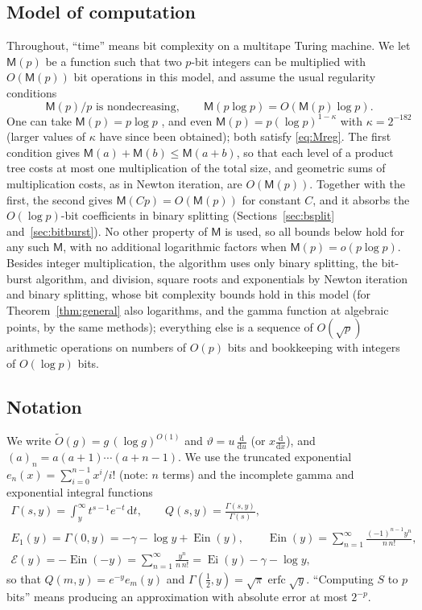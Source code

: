\documentclass[11pt]{amsart}
\theoremstyle{definition}
\theoremstyle{remark}
\newcommand{\Ein}{\operatorname{Ein}}
\newcommand{\Eip}{\mathcal{E}}
\newcommand{\erfc}{\operatorname{erfc}}
\newcommand{\dd}{\,\mathrm{d}}
\newcommand{\Mul}{\mathsf{M}}
\begin{document}
\subsection{Model of computation}
Throughout, ``time'' means bit complexity on a multitape Turing machine. We let $\Mul(p)$ be a function such that
two $p$-bit integers can be multiplied with $O(\Mul(p))$ bit operations in this model, and assume the usual
regularity conditions
\begin{equation}\label{eq:Mreg}
  \Mul(p)/p \text{ is nondecreasing}, \qquad \Mul(p\log p) = O(\Mul(p)\log p).
\end{equation}
One can take $\Mul(p) = p\log p$ \cite{HvdH21}, and even $\Mul(p) = p(\log p)^{1-\kappa}$ with $\kappa = 2^{-182}$
\cite{OAI26} (larger values of $\kappa$ have since been obtained); both satisfy \eqref{eq:Mreg}. The first condition
gives $\Mul(a) + \Mul(b) \le \Mul(a+b)$, so that each level of a product tree costs at most one multiplication of
the total size, and geometric sums of multiplication costs, as in Newton iteration, are $O(\Mul(p))$. Together with
the first, the second gives $\Mul(Cp) = O(\Mul(p))$ for constant $C$, and it absorbs the $O(\log p)$-bit
coefficients in binary splitting (Sections~\ref{sec:bsplit} and~\ref{sec:bitburst}). No other property of $\Mul$
is used, so all bounds below hold for any such $\Mul$, with no additional logarithmic factors when
$\Mul(p) = o(p\log p)$. Besides integer
multiplication, the algorithm uses only binary splitting, the bit-burst algorithm, and division, square
roots and exponentials by Newton iteration and binary splitting, whose bit complexity bounds hold in this
model \cite{BZ10} (for Theorem~\ref{thm:general} also logarithms, and the gamma function at algebraic
points, by the same methods); everything else is a sequence of $O(\sqrt p)$ arithmetic operations on numbers of $O(p)$
bits and bookkeeping with integers of $O(\log p)$ bits.

\subsection{Notation}
We write $\widetilde O(g) = g\,(\log g)^{O(1)}$ and $\vartheta = u\,\frac{\mathrm{d}}{\mathrm{d}u}$ (or
$x\frac{\mathrm{d}}{\mathrm{d}x}$), and $(a)_n = a(a+1)\cdots(a+n-1)$. We use the truncated exponential
$e_n(x) = \sum_{i=0}^{n-1} x^i/i!$ (note: $n$ terms) and the incomplete gamma and exponential integral functions
\begin{gather*}
  \Gamma(s, y) = \int_y^\infty t^{s-1}e^{-t}\dd t, \qquad Q(s,y) = \frac{\Gamma(s,y)}{\Gamma(s)}, \\
  E_1(y) = \Gamma(0, y) = -\gamma - \log y + \Ein(y), \qquad \Ein(y) = \sum_{n=1}^{\infty}\frac{(-1)^{n-1}y^n}{n\,n!}, \\
  \Eip(y) = -\Ein(-y) = \sum_{n=1}^{\infty}\frac{y^n}{n\,n!} = \operatorname{Ei}(y) - \gamma - \log y,
\end{gather*}
so that $Q(m, y) = e^{-y} e_m(y)$ and $\Gamma(\frac12, y) = \sqrt\pi\erfc\sqrt y$. ``Computing $S$ to $p$ bits''
means producing an approximation with absolute error at most $2^{-p}$.
\end{document}
